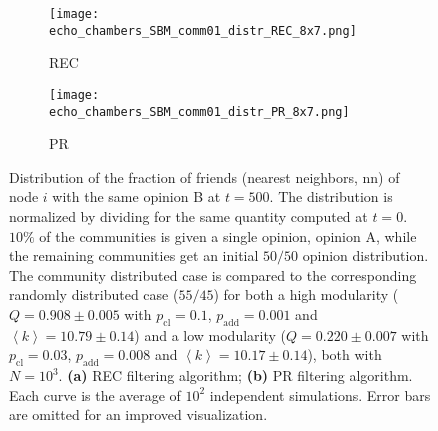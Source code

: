 \documentclass[11 pt , letterpaper , twoside , openright]{book}
\begin{document}
\begin{figure}[H]
  \begin{subfigure}[b]{0.49\textwidth}
    \caption{REC}
  	\texttt{[image: echo\_chambers\_SBM\_comm01\_distr\_REC\_8x7.png]}
    \label{rec_comm_echo}
  \end{subfigure}
  \begin{subfigure}[b]{0.49\textwidth}
    \caption{PR}
  	\texttt{[image: echo\_chambers\_SBM\_comm01\_distr\_PR\_8x7.png]}
    \label{pr_comm_echo}
  \end{subfigure}
  \captionsetup{format=plain}
  \caption[Distribution of the fraction of friends (nearest neighbors, nn) of node $i$ with the same opinion B at $t = 500$. $10 \%$ of the communities is given a single opinion, opinion A, while the remaining communities get an initial $50/50$ opinion distribution. The community distributed case is compared to the corresponding randomly distributed case ($55/45$) for both a high modularity and a low modularity network. Results for the REC and PR filtering algorithms.]{Distribution of the fraction of friends (nearest neighbors, nn) of node $i$ with the same opinion B at $t = 500$. The distribution is normalized by dividing for the same quantity computed at $t=0$. $10 \%$ of the communities is given a single opinion, opinion A, while the remaining communities get an initial $50/50$ opinion distribution. The community distributed case is compared to the corresponding randomly distributed case ($55/45$) for both a high modularity ($Q = 0.908 \pm 0.005$ with $p_{\text{cl}} = 0.1$, $p_{\text{add}} = 0.001$ and $\left<k\right> = 10.79 \pm 0.14$) and a low modularity ($Q = 0.220 \pm 0.007$ with $p_{\text{cl}} = 0.03$, $p_{\text{add}} = 0.008$ and $\left<k\right> = 10.17 \pm 0.14$), both with $N=10^3$. \textbf{(a)} REC filtering algorithm; \textbf{(b)} PR filtering algorithm. Each curve is the average of $10^2$ independent simulations. Error bars are omitted for an improved visualization.}
\label{echo_01_commOp0_other_50-50}
\end{figure}
\noindent
\end{document}
